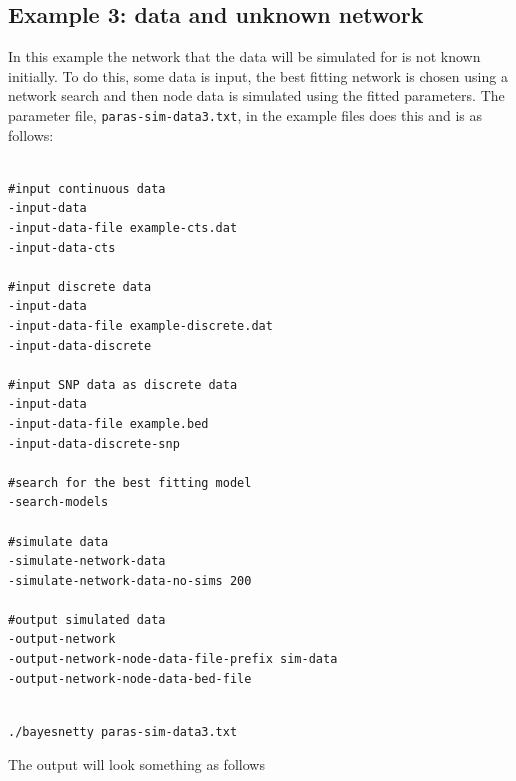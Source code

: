 \documentclass[a4paper,12pt]{article}
\newcommand{\code}[1]{{\footnotesize{{\tt #1}}}}
\begin{document}

\subsection{Example 3: data and unknown network}
\label{sim-data-example3}

In this example the network that the data will be simulated for is not known initially. To do this, some data is input, the best fitting network is chosen using a network search and then node data is simulated using the fitted parameters. The parameter file, \code{paras-sim-data3.txt}, in the example files does this and is as follows: 
\vspace{0.35cm} \begin{lstlisting}

#input continuous data
-input-data
-input-data-file example-cts.dat
-input-data-cts

#input discrete data
-input-data
-input-data-file example-discrete.dat
-input-data-discrete

#input SNP data as discrete data
-input-data
-input-data-file example.bed
-input-data-discrete-snp

#search for the best fitting model
-search-models

#simulate data
-simulate-network-data
-simulate-network-data-no-sims 200

#output simulated data
-output-network
-output-network-node-data-file-prefix sim-data
-output-network-node-data-bed-file

\end{lstlisting} \vspace{0.35cm}\vspace{0.35cm} \begin{lstlisting}

./bayesnetty paras-sim-data3.txt

\end{lstlisting} \vspace{0.35cm}
The output will look something as follows 
\end{document}

